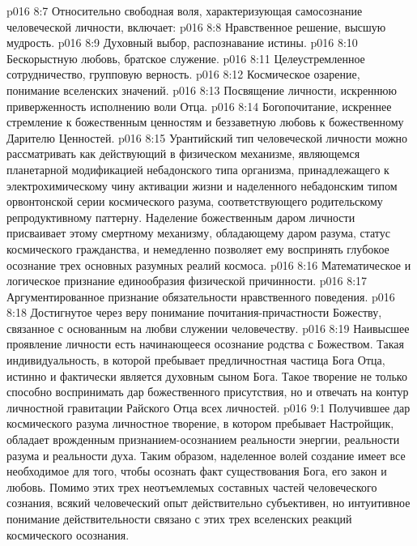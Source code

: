 \vs p016 8:7 \pc Относительно свободная воля, характеризующая самосознание человеческой личности, включает:
\vs p016 8:8 \bibnobreakspace Нравственное решение, высшую мудрость.
\vs p016 8:9 \bibnobreakspace Духовный выбор, распознавание истины.
\vs p016 8:10 \bibnobreakspace Бескорыстную любовь, братское служение.
\vs p016 8:11 \bibnobreakspace Целеустремленное сотрудничество, групповую верность.
\vs p016 8:12 \bibnobreakspace Космическое озарение, понимание вселенских значений.
\vs p016 8:13 \bibnobreakspace Посвящение личности, искреннюю приверженность исполнению воли Отца.
\vs p016 8:14 \bibnobreakspace Богопочитание, искреннее стремление к божественным ценностям и беззаветную любовь к божественному Дарителю Ценностей.
\vs p016 8:15 \pc Урантийский тип человеческой личности можно рассматривать как действующий в физическом механизме, являющемся планетарной модификацией небадонского типа организма, принадлежащего к электрохимическому чину активации жизни и наделенного небадонским типом орвонтонской серии космического разума, соответствующего родительскому репродуктивному паттерну. Наделение божественным даром личности присваивает этому смертному механизму, обладающему даром разума, статус космического гражданства, и немедленно позволяет ему воспринять глубокое осознание трех основных разумных реалий космоса.
\vs p016 8:16 \bibnobreakspace Математическое и логическое признание единообразия физической причинности.
\vs p016 8:17 \bibnobreakspace Аргументированное признание обязательности нравственного поведения.
\vs p016 8:18 \bibnobreakspace Достигнутое через веру понимание почитания\hyp{}причастности Божеству, связанное с основанным на любви служении человечеству.
\vs p016 8:19 \pc Наивысшее проявление личности есть начинающееся осознание родства с Божеством. Такая индивидуальность, в которой пребывает предличностная частица Бога Отца, истинно и фактически является духовным сыном Бога. Такое творение не только способно воспринимать дар божественного присутствия, но и отвечать на контур личностной гравитации Райского Отца всех личностей.
\vs p016 9:1 Получившее дар космического разума личностное творение, в котором пребывает Настройщик, обладает врожденным признанием\hyp{}осознанием реальности энергии, реальности разума и реальности духа. Таким образом, наделенное волей создание имеет все необходимое для того, чтобы осознать факт существования Бога, его закон и любовь. Помимо этих трех неотъемлемых составных частей человеческого сознания, всякий человеческий опыт действительно субъективен, но интуитивное понимание действительности связано с  этих трех вселенских реакций космического осознания.
